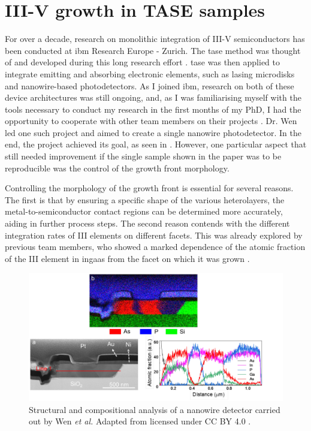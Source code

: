 \chapter{III-V growth in TASE samples}
\label{chap:growth}

For over a decade, research on monolithic integration of III-V semiconductors has been conducted at \acs{ibm} Research Europe - Zurich. The \acf{tase} method was thought of and developed during this long research effort \cite{borgTASEp2018, Mauthe2021}. \acs{tase} was then applied to integrate emitting and absorbing electronic elements, such as lasing microdisks and nanowire-based photodetectors. As I joined \acs{ibm}, research on both of these device architectures was still ongoing, and, as I was familiarising myself with the tools necessary to conduct my research in the first months of my PhD, I had the opportunity to cooperate with other team members on their projects \cite{Tiwari2021}. Dr. Wen led one such project and aimed to create a single nanowire photodetector. In the end, the project achieved its goal, as seen in \cite{Wen2022}. However, one particular aspect that still needed improvement if the single sample shown in the paper was to be reproducible was the control of the growth front morphology.

Controlling the morphology of the growth front is essential for several reasons. The first is that by ensuring a specific shape of the various heterolayers, the metal-to-semiconductor contact regions can be determined more accurately, aiding in further process steps. The second reason contends with the different integration rates of III elements on different facets. This was already explored by previous team members, who showed a marked dependence of the atomic fraction of the III element in \acs{ingaas} from the facet on which it was grown \cite{Borg2019}.

\begin{figure}
    \centering
    \includegraphics[width = \textwidth]{3_Growth/wen.pdf}
    \caption{Structural and compositional analysis of a nanowire detector carried out by Wen \textit{et al.} Adapted from \cite{Wen2022} licensed under CC BY 4.0 \cite{CCBY40}.}
    \label{fig:wen}
\end{figure}

